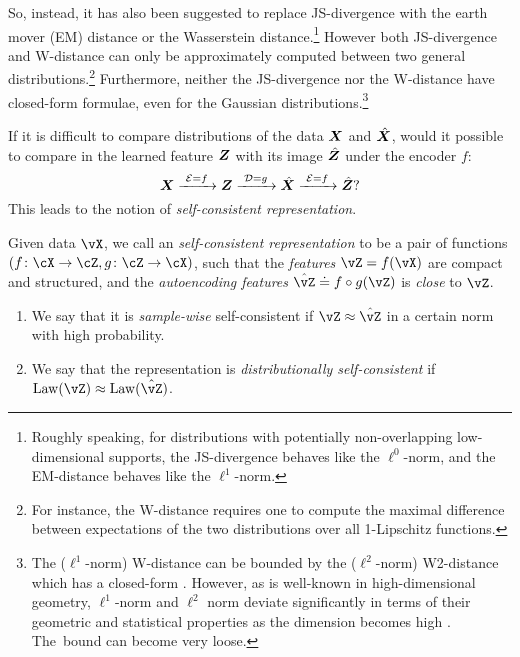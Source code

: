 \documentclass[\toplevelprefix/book-main.tex]{subfiles}
\begin{document}
So, instead, it has also been suggested to replace JS-divergence with the earth mover (EM) distance or the Wasserstein distance.\footnote{Roughly speaking, for distributions with potentially non-overlapping low-dimensional supports, the JS-divergence behaves like the $\ell^0$-norm, and the EM-distance behaves like the $\ell^1$-norm.} However both JS-divergence and W-distance can only be approximately computed between two general distributions.\footnote{For instance, the W-distance requires one to compute the maximal difference between expectations of the two distributions over all 1-Lipschitz functions.} Furthermore, neither the JS-divergence nor the W-distance have closed-form formulae, even for the Gaussian distributions.\footnote{The ($\ell^1$-norm) W-distance can be bounded by the ($\ell^2$-norm) W2-distance which has a closed-form \cite{salmona2021gromovwasserstein}. However, as is well-known in high-dimensional geometry, $\ell^1$-norm and $\ell^2$ norm deviate significantly in terms of their geometric and statistical properties as the dimension becomes high \cite{Wright-Ma-2021}. The~bound can become very loose.} 

If it is difficult to compare distributions of the data $\bm{X}$ and $\hat {\bm{X}}$, would it possible to compare in the learned feature $\bm{Z}$ with its image $\hat {\bm{Z}}$ under the encoder $f$: 
\begin{equation}
 \bm{X}
\xrightarrow{\hspace{1mm} \mathcal{E} = f \hspace{1mm}} \bm{Z}  \xrightarrow{\hspace{1mm} \mathcal{D} = g \hspace{1mm}} \hat{\bm{X}} \xrightarrow{\hspace{1mm} \mathcal{E} = f \hspace{1mm}} \hat {\bm{Z}}?
\label{eqn:closed-autoencoding}
\end{equation}
This leads to the notion of {\em self-consistent representation}.
\begin{definition}\label{def:closed_loop}
    Given data \(\vX\), we call an \textit{self-consistent representation} to be a pair of functions \((f \colon \cX \to \cZ, g \colon \cZ \to \cX)\), such that the \textit{features} \(\vZ = f(\vX)\) are compact and structured, and the \textit{autoencoding features} \(\hat{\vZ} \doteq f \circ g(\vZ)\) is \textit{close} to \(\vZ\). 
    \begin{enumerate}
        \item We say that it is \textit{sample-wise} self-consistent if \(\vZ \approx \hat{\vZ}\) in a certain norm  with high probability.
        \item We say that the representation is \textit{distributionally self-consistent} if \(\Law(\vZ) \approx \Law(\hat{\vZ})\).
    \end{enumerate}
\end{definition}
\end{document}
